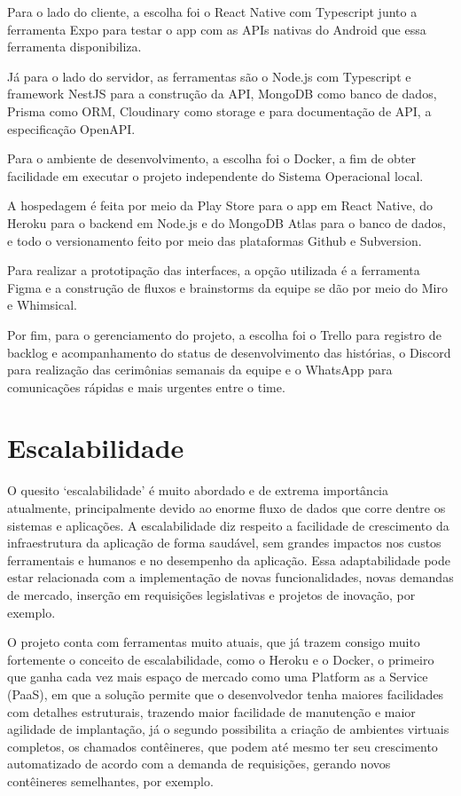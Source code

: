 Para o lado do cliente, a escolha foi o React Native com Typescript junto a ferramenta Expo para testar o app com as APIs nativas do Android que essa ferramenta disponibiliza.

Já para o lado do servidor, as ferramentas são o Node.js com Typescript e framework NestJS para a construção da API, MongoDB como banco de dados, Prisma como ORM, Cloudinary como storage e para documentação de API, a especificação OpenAPI.

Para o ambiente de desenvolvimento, a escolha foi o Docker, a fim de obter facilidade em executar o projeto independente do Sistema Operacional local.

A hospedagem é feita por meio da Play Store para o app em React Native, do Heroku para o backend em Node.js e do MongoDB Atlas para o banco de dados, e todo o versionamento feito por meio das plataformas Github e Subversion.

Para realizar a prototipação das interfaces, a opção utilizada é a ferramenta Figma e a construção de fluxos e brainstorms da equipe se dão por meio do Miro e Whimsical.

Por fim, para o gerenciamento do projeto, a escolha foi o Trello para registro de backlog e acompanhamento do status de desenvolvimento das histórias, o Discord para realização das cerimônias semanais da equipe e o WhatsApp para comunicações rápidas e mais urgentes entre o time.

\section{Escalabilidade}

O quesito ‘escalabilidade’ é muito abordado e de extrema importância atualmente, principalmente devido ao enorme fluxo de dados que corre dentre os sistemas e aplicações. A escalabilidade diz respeito a facilidade de crescimento da infraestrutura da aplicação de forma saudável, sem grandes impactos nos custos ferramentais e humanos e no desempenho da aplicação. Essa adaptabilidade pode estar relacionada com a implementação de novas funcionalidades, novas demandas de mercado, inserção em requisições legislativas e projetos de inovação, por exemplo. 

O projeto conta com ferramentas muito atuais, que já trazem consigo muito fortemente o conceito de escalabilidade, como o Heroku e o Docker, o primeiro que ganha cada vez mais espaço de mercado como uma Platform as a Service (PaaS), em que a solução permite que o desenvolvedor tenha maiores facilidades com detalhes estruturais, trazendo maior facilidade de manutenção e maior agilidade de implantação, já o segundo possibilita a criação de ambientes virtuais completos, os chamados contêineres, que podem até mesmo ter seu crescimento automatizado de acordo com a demanda de requisições, gerando novos contêineres semelhantes, por exemplo. 


